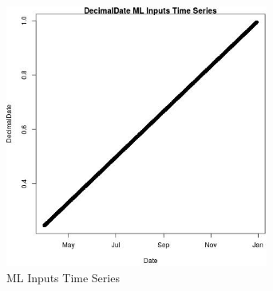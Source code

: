 \begin{figure} 
\centering  
\includegraphics[width=0.77\textwidth]{Code_Outputs/Report_ML_input_PM25_Step4_part_e_de_duplicated_aves_DecimalDatevDate.jpg} 
\caption{\label{fig:Report_ML_input_PM25_Step4_part_e_de_duplicated_avesDecimalDatevDate}ML Inputs Time Series} 
\end{figure} 
 
